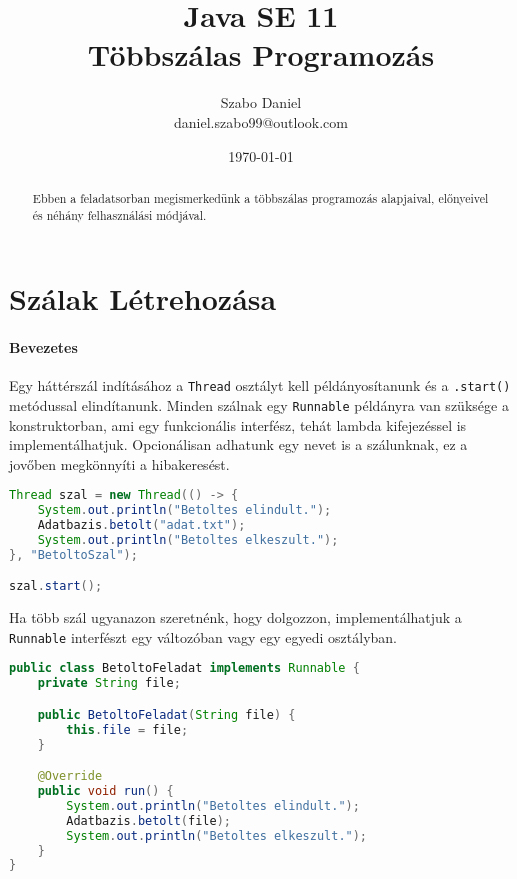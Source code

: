 \documentclass{article}
\title{%
Java SE 11 \\
\large Többszálas Programozás}
\author{Szabo Daniel\\daniel.szabo99@outlook.com}
\date{\today}
\let\l\lstinline
\begin{document}
	\maketitle
	\begin{abstract}
		Ebben a feladatsorban megismerkedünk a többszálas programozás alapjaival, előnyeivel és néhány felhasználási módjával.
	\end{abstract}

	\newpage

	\tableofcontents{}

	\newpage

	\section{Szálak Létrehozása}
	\paragraph{Bevezetes}

	Egy háttérszál indításához a \l{Thread} osztályt kell példányosítanunk és a \l{.start()} metódussal elindítanunk. Minden szálnak egy \l{Runnable} példányra van szüksége a konstruktorban, ami egy funkcionális interfész, tehát lambda kifejezéssel is implementálhatjuk. Opcionálisan adhatunk egy nevet is a szálunknak, ez a jovőben megkönnyíti a hibakeresést.

	\begin{lstlisting}[language=Java, caption=Új szál indítása]
Thread szal = new Thread(() -> {
	System.out.println("Betoltes elindult.");
	Adatbazis.betolt("adat.txt");
	System.out.println("Betoltes elkeszult.");
}, "BetoltoSzal");

szal.start();
	\end{lstlisting}

	Ha több szál ugyanazon szeretnénk, hogy dolgozzon, implementálhatjuk a \l{Runnable} interfészt egy változóban vagy egy egyedi osztályban.

\begin{lstlisting}[language=Java, caption=Új Runnable készítése]
public class BetoltoFeladat implements Runnable {
	private String file;

	public BetoltoFeladat(String file) {
		this.file = file;
	}

	@Override
	public void run() {
		System.out.println("Betoltes elindult.");
		Adatbazis.betolt(file);
		System.out.println("Betoltes elkeszult.");
	}
}
	\end{lstlisting}
\end{document}
